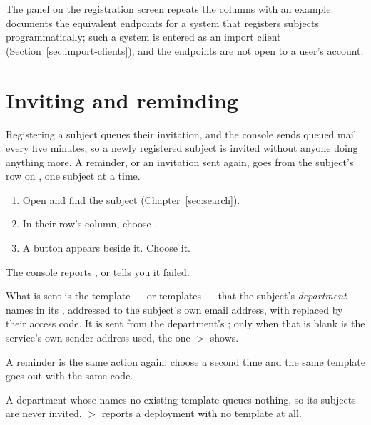 \documentclass[11pt, a4paper]{article}
\begin{document}
The  panel on the registration screen repeats the columns with an example.
 documents the equivalent endpoints for a system that registers
subjects programmatically; such a system is entered as an import client
(Section~\ref{sec:import-clients}), and the endpoints are not open to a user's account.

\section{Inviting and reminding}
\label{sec:invite}

Registering a subject queues their invitation, and the console sends queued mail every five
minutes, so a newly registered subject is invited without anyone doing anything more. A
reminder, or an invitation sent again, goes from the subject's row on , one
subject at a time.

\begin{enumerate}
  \item Open  and find the subject (Chapter~\ref{sec:search}).
  \item In their row's  column, choose .
  \item A  button appears beside it. Choose it.
\end{enumerate}


The console reports , or tells you it failed.

What is sent is the template — or templates — that the subject's \emph{department} names in its
, addressed to the subject's own email address, with
 replaced by their access code. It is sent from the department's
; only when that is blank is the service's own sender address used, the one
 $>$  shows.

A reminder is the same action again: choose  a second time and the same template
goes out with the same code.

\begin{elicitcaution}
A department whose  names no existing template queues nothing, so its
subjects are never invited.  $>$  reports a deployment with no template
at all.
\end{elicitcaution}
\end{document}
